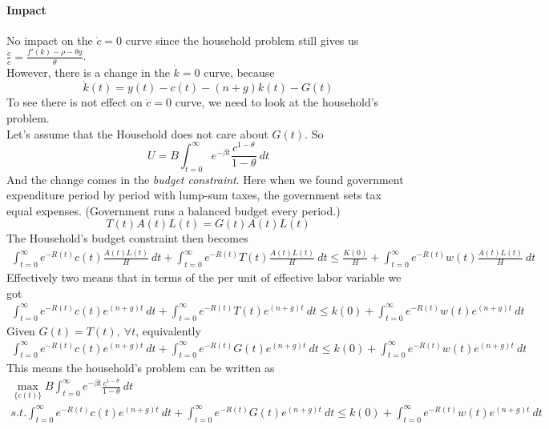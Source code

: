 \documentclass[11pt]{article}
\begin{document}
			\paragraph{Impact}No impact on the $\dot{c} = 0$ curve since the household problem still gives us $\frac{\dot{c}}{c} = \frac{f'(k)-\rho-\theta g}{\theta}$. \\
			However, there is a change in the $\dot{k}=0$ curve, because 
			\begin{equation}
				\dot{k}(t) = y(t) - c(t) - (n+g)k(t) - G(t)
			\end{equation}
			To see there is not effect on $\dot{c}=0$ curve, we need to look at the household's problem. \\
			Let's assume that the Household does not care about $G(t)$. So
			\[
				U = B\int_{t=0}^\infty e^{-\beta t} \frac{c^{1-\theta}}{1-\theta}\ dt
			\]
			And the change comes in the \emph{budget constraint}. Here when we found government expenditure period by period with lump-sum taxes, the government sets tax equal expenses. (Government runs a balanced budget every period.)
			\[
				T(t)A(t)L(t) = G(t)A(t)L(t)
			\]
			The Household's budget constraint then becomes 
			\begin{gather}
				\int_{t=0}^\infty e^{-R(t)} c(t)\frac{A(t)L(t)}{H}\ dt + \int_{t=0}^\infty e^{-R(t)} T(t) \frac{A(t)L(t)}{H}\ dt \leq \frac{K(0)}{H} + \int_{t=0}^\infty e^{-R(t)} w(t) \frac{A(t)L(t)}{H}\ dt
			\end{gather}
			Effectively two means that in terms of the per unit of effective labor variable we got 
			\begin{gather}
				\int_{t=0}^\infty e^{-R(t)} c(t) e^{(n+g)t}\ dt + \int_{t=0}^\infty e^{-R(t)} T(t) e^{(n+g)t}\ dt \leq k(0) + \int_{t=0}^\infty e^{-R(t)} w(t) e^{(n+g)t} \ dt
			\end{gather}
			Given $G(t) = T(t),\ \forall t$, equivalently
			\begin{gather}
				\int_{t=0}^\infty e^{-R(t)} c(t) e^{(n+g)t}\ dt + \int_{t=0}^\infty e^{-R(t)} G(t) e^{(n+g)t}\ dt \leq k(0) + \int_{t=0}^\infty e^{-R(t)} w(t) e^{(n+g)t} \ dt
			\end{gather}
			This means the household's problem can be written as 
			\begin{gather}
				\max_{\{c(t)\}} B\int_{t=0}^\infty e^{-\beta t} \frac{c^{1-\theta}}{1-\theta}\ dt \\
				s.t. \int_{t=0}^\infty e^{-R(t)} c(t) e^{(n+g)t}\ dt + \int_{t=0}^\infty e^{-R(t)} G(t) e^{(n+g)t}\ dt \leq k(0) + \int_{t=0}^\infty e^{-R(t)} w(t) e^{(n+g)t} \ dt
			\end{gather}
\end{document}
